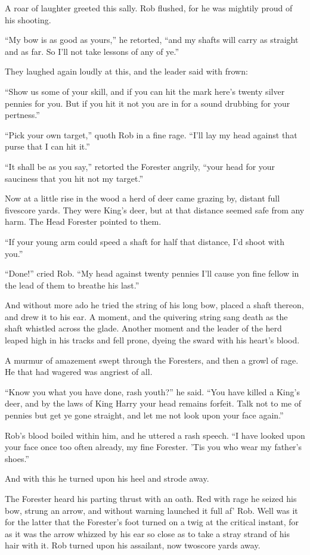 A roar of laughter greeted this sally. Rob flushed, for he was mightily
proud of his shooting.

``My bow is as good as yours,'' he retorted, ``and my shafts will carry
as straight and as far. So I'll not take lessons of any of ye.''

They laughed again loudly at this, and the leader said with frown:

``Show us some of your skill, and if you can hit the mark here's twenty
silver pennies for you. But if you hit it not you are in for a sound
drubbing for your pertness.''

``Pick your own target,'' quoth Rob in a fine rage. ``I'll lay my head
against that purse that I can hit it.''

``It shall be as you say,'' retorted the Forester angrily, ``your head
for your sauciness that you hit not my target.''

Now at a little rise in the wood a herd of deer came grazing by, distant
full fivescore yards. They were King's deer, but at that distance seemed
safe from any harm. The Head Forester pointed to them.

``If your young arm could speed a shaft for half that distance, I'd
shoot with you.''

``Done!'' cried Rob. ``My head against twenty pennies I'll cause yon
fine fellow in the lead of them to breathe his last.''

And without more ado he tried the string of his long bow, placed a shaft
thereon, and drew it to his ear. A moment, and the quivering string sang
death as the shaft whistled across the glade. Another moment and the
leader of the herd leaped high in his tracks and fell prone, dyeing the
sward with his heart's blood.

A murmur of amazement swept through the Foresters, and then a growl of
rage. He that had wagered was angriest of all.

``Know you what you have done, rash youth?'' he said. ``You have killed
a King's deer, and by the laws of King Harry your head remains forfeit.
Talk not to me of pennies but get ye gone straight, and let me not look
upon your face again.''

Rob's blood boiled within him, and he uttered a rash speech. ``I have
looked upon your face once too often already, my fine Forester. 'Tis you
who wear my father's shoes.''

And with this he turned upon his heel and strode away.

The Forester heard his parting thrust with an oath. Red with rage he
seized his bow, strung an arrow, and without warning launched it full
af' Rob. Well was it for the latter that the Forester's foot turned on a
twig at the critical instant, for as it was the arrow whizzed by his ear
so close as to take a stray strand of his hair with it. Rob turned upon
his assailant, now twoscore yards away.

